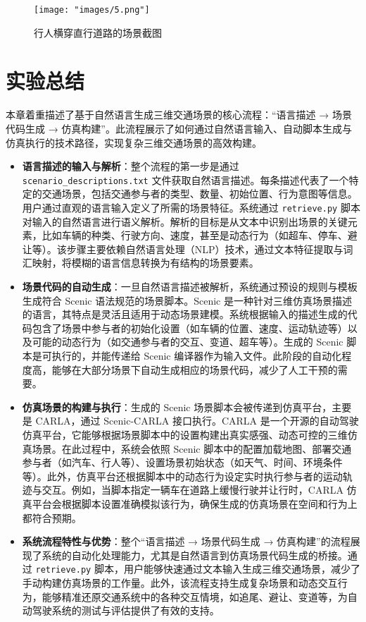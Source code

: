 \begin{figure}[H]
	\centering
	\texttt{[image: "images/5.png"]}
	\caption{行人横穿直行道路的场景截图}
	\label{fig:pedestrian_crossing}
\end{figure}

\section{实验总结}

本章着重描述了基于自然语言生成三维交通场景的核心流程：“语言描述 → 场景代码生成 → 仿真构建”。此流程展示了如何通过自然语言输入、自动脚本生成与仿真执行的技术路径，实现复杂三维交通场景的高效构建。

\begin{itemize}
	\item \textbf{语言描述的输入与解析}：整个流程的第一步是通过 \texttt{scenario\_descriptions.txt} 文件获取自然语言描述。每条描述代表了一个特定的交通场景，包括交通参与者的类型、数量、初始位置、行为意图等信息。用户通过直观的语言输入定义了所需的场景特征。系统通过 \texttt{retrieve.py} 脚本对输入的自然语言进行语义解析。解析的目标是从文本中识别出场景的关键元素，比如车辆的种类、行驶方向、速度，甚至是动态行为（如超车、停车、避让等）。该步骤主要依赖自然语言处理（NLP）技术，通过文本特征提取与词汇映射，将模糊的语言信息转换为有结构的场景要素。
	
	\item \textbf{场景代码的自动生成}：一旦自然语言描述被解析，系统通过预设的规则与模板生成符合 Scenic 语法规范的场景脚本。Scenic 是一种针对三维仿真场景描述的语言，其特点是灵活且适用于动态场景建模。系统根据输入的描述生成的代码包含了场景中参与者的初始化设置（如车辆的位置、速度、运动轨迹等）以及可能的动态行为（如交通参与者的交互、变道、超车等）。生成的 Scenic 脚本是可执行的，并能传递给 Scenic 编译器作为输入文件。此阶段的自动化程度高，能够在大部分场景下自动生成相应的场景代码，减少了人工干预的需要。
	
	\item \textbf{仿真场景的构建与执行}：生成的 Scenic 场景脚本会被传递到仿真平台，主要是 CARLA，通过 Scenic-CARLA 接口执行。CARLA 是一个开源的自动驾驶仿真平台，它能够根据场景脚本中的设置构建出真实感强、动态可控的三维仿真场景。在此过程中，系统会依照 Scenic 脚本中的配置加载地图、部署交通参与者（如汽车、行人等）、设置场景初始状态（如天气、时间、环境条件等）。此外，仿真平台还根据脚本中的动态行为设定实时执行参与者的运动轨迹与交互。例如，当脚本指定一辆车在道路上缓慢行驶并让行时，CARLA 仿真平台会根据脚本设置准确模拟该行为，确保生成的仿真场景在空间和行为上都符合预期。
	
	\item \textbf{系统流程特性与优势}：整个“语言描述 → 场景代码生成 → 仿真构建”的流程展现了系统的自动化处理能力，尤其是自然语言到仿真场景代码生成的桥接。通过 \texttt{retrieve.py} 脚本，用户能够快速通过文本输入生成三维交通场景，减少了手动构建仿真场景的工作量。此外，该流程支持生成复杂场景和动态交互行为，能够精准还原交通系统中的各种交互情境，如追尾、避让、变道等，为自动驾驶系统的测试与评估提供了有效的支持。
	
\end{itemize}
